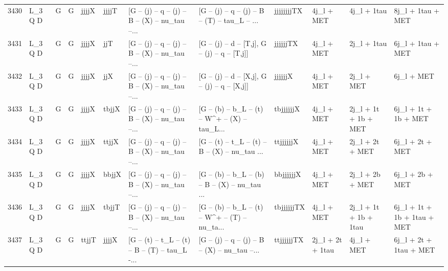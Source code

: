 \begin{tabular}{llllllllllll}
3430 &      L\_3 Q D &     G &     G &       jjjjX &       jjjjT &  [G -- (j) -- q -- (j) -- B -- (X) -- nu\_tau --... &  [G -- (j) -- q -- (j) -- B -- (T) -- tau\_L -- ... &  jjjjjjjjTX &               4j\_l + MET &              4j\_l + 1tau &                  8j\_l + 1tau + MET \\
3431 &      L\_3 Q D &     G &     G &       jjjjX &         jjT &  [G -- (j) -- q -- (j) -- B -- (X) -- nu\_tau --... &   [G -- (j) -- d -- [T,j], G -- (j) -- q -- [T,j]] &    jjjjjjTX &               4j\_l + MET &              2j\_l + 1tau &                  6j\_l + 1tau + MET \\
3432 &      L\_3 Q D &     G &     G &       jjjjX &         jjX &  [G -- (j) -- q -- (j) -- B -- (X) -- nu\_tau --... &   [G -- (j) -- d -- [X,j], G -- (j) -- q -- [X,j]] &     jjjjjjX &               4j\_l + MET &               2j\_l + MET &                         6j\_l + MET \\
3433 &      L\_3 Q D &     G &     G &       jjjjX &       tbjjX &  [G -- (j) -- q -- (j) -- B -- (X) -- nu\_tau --... &  [G -- (b) -- b\_L -- (t) -- W\textasciicircum + -- (X) -- tau\_L... &   tbjjjjjjX &               4j\_l + MET &     2j\_l + 1t + 1b + MET &               6j\_l + 1t + 1b + MET \\
3434 &      L\_3 Q D &     G &     G &       jjjjX &       ttjjX &  [G -- (j) -- q -- (j) -- B -- (X) -- nu\_tau --... &  [G -- (t) -- t\_L -- (t) -- B -- (X) -- nu\_tau ... &   ttjjjjjjX &               4j\_l + MET &          2j\_l + 2t + MET &                    6j\_l + 2t + MET \\
3435 &      L\_3 Q D &     G &     G &       jjjjX &       bbjjX &  [G -- (j) -- q -- (j) -- B -- (X) -- nu\_tau --... &  [G -- (b) -- b\_L -- (b) -- B -- (X) -- nu\_tau ... &   bbjjjjjjX &               4j\_l + MET &          2j\_l + 2b + MET &                    6j\_l + 2b + MET \\
3436 &      L\_3 Q D &     G &     G &       jjjjX &       tbjjT &  [G -- (j) -- q -- (j) -- B -- (X) -- nu\_tau --... &  [G -- (b) -- b\_L -- (t) -- W\textasciicircum + -- (T) -- nu\_ta... &  tbjjjjjjTX &               4j\_l + MET &    2j\_l + 1t + 1b + 1tau &        6j\_l + 1t + 1b + 1tau + MET \\
3437 &      L\_3 Q D &     G &     G &       ttjjT &       jjjjX &  [G -- (t) -- t\_L -- (t) -- B -- (T) -- tau\_L -... &  [G -- (j) -- q -- (j) -- B -- (X) -- nu\_tau --... &  ttjjjjjjTX &         2j\_l + 2t + 1tau &               4j\_l + MET &             6j\_l + 2t + 1tau + MET \\

\end{tabular}
